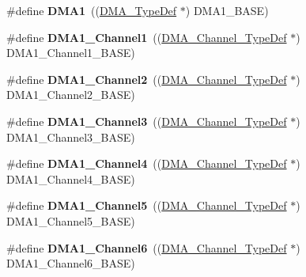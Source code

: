 \begin{DoxyCompactItemize}
\item 
\hypertarget{group___peripheral__declaration_gacc16d2a5937f7585320a98f7f6b578f9}{\#define {\bfseries D\-M\-A1}~((\hyperlink{struct_d_m_a___type_def}{D\-M\-A\-\_\-\-Type\-Def} $\ast$) D\-M\-A1\-\_\-\-B\-A\-S\-E)}\label{group___peripheral__declaration_gacc16d2a5937f7585320a98f7f6b578f9}

\item 
\hypertarget{group___peripheral__declaration_gac83c5be824be1c02716e2522e80ddf7a}{\#define {\bfseries D\-M\-A1\-\_\-\-Channel1}~((\hyperlink{struct_d_m_a___channel___type_def}{D\-M\-A\-\_\-\-Channel\-\_\-\-Type\-Def} $\ast$) D\-M\-A1\-\_\-\-Channel1\-\_\-\-B\-A\-S\-E)}\label{group___peripheral__declaration_gac83c5be824be1c02716e2522e80ddf7a}

\item 
\hypertarget{group___peripheral__declaration_ga23d7631dd10c645e06971b2543ba2949}{\#define {\bfseries D\-M\-A1\-\_\-\-Channel2}~((\hyperlink{struct_d_m_a___channel___type_def}{D\-M\-A\-\_\-\-Channel\-\_\-\-Type\-Def} $\ast$) D\-M\-A1\-\_\-\-Channel2\-\_\-\-B\-A\-S\-E)}\label{group___peripheral__declaration_ga23d7631dd10c645e06971b2543ba2949}

\item 
\hypertarget{group___peripheral__declaration_gacf7b6093a37b306d7f1f50b2f200f0d0}{\#define {\bfseries D\-M\-A1\-\_\-\-Channel3}~((\hyperlink{struct_d_m_a___channel___type_def}{D\-M\-A\-\_\-\-Channel\-\_\-\-Type\-Def} $\ast$) D\-M\-A1\-\_\-\-Channel3\-\_\-\-B\-A\-S\-E)}\label{group___peripheral__declaration_gacf7b6093a37b306d7f1f50b2f200f0d0}

\item 
\hypertarget{group___peripheral__declaration_gad2c42743316bf64da557130061b1f56a}{\#define {\bfseries D\-M\-A1\-\_\-\-Channel4}~((\hyperlink{struct_d_m_a___channel___type_def}{D\-M\-A\-\_\-\-Channel\-\_\-\-Type\-Def} $\ast$) D\-M\-A1\-\_\-\-Channel4\-\_\-\-B\-A\-S\-E)}\label{group___peripheral__declaration_gad2c42743316bf64da557130061b1f56a}

\item 
\hypertarget{group___peripheral__declaration_ga06ff98ddef3c962795d2e2444004abff}{\#define {\bfseries D\-M\-A1\-\_\-\-Channel5}~((\hyperlink{struct_d_m_a___channel___type_def}{D\-M\-A\-\_\-\-Channel\-\_\-\-Type\-Def} $\ast$) D\-M\-A1\-\_\-\-Channel5\-\_\-\-B\-A\-S\-E)}\label{group___peripheral__declaration_ga06ff98ddef3c962795d2e2444004abff}

\item 
\hypertarget{group___peripheral__declaration_gac013c4376e4797831b5ddd2a09519df8}{\#define {\bfseries D\-M\-A1\-\_\-\-Channel6}~((\hyperlink{struct_d_m_a___channel___type_def}{D\-M\-A\-\_\-\-Channel\-\_\-\-Type\-Def} $\ast$) D\-M\-A1\-\_\-\-Channel6\-\_\-\-B\-A\-S\-E)}\label{group___peripheral__declaration_gac013c4376e4797831b5ddd2a09519df8}


\end{DoxyCompactItemize}
